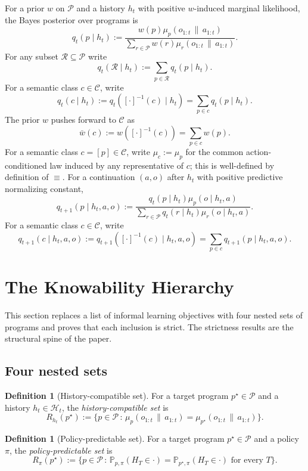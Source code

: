 \documentclass[11pt]{article}
\theoremstyle{definition}
\newtheorem{definition}[theorem]{Definition}
\theoremstyle{remark}
\newcommand{\Ccal}{\mathcal{C}}
\newcommand{\Pcal}{\mathcal{P}}
\newcommand{\Hcal}{\mathcal{H}}
\newcommand{\Rcal}{\mathcal{R}}
\newcommand{\Prob}{\mathbb{P}}
\newcommand{\givena}{\,\|\,}
\begin{document}
For a prior $w$ on $\Pcal$ and a history $h_t$ with positive $w$-induced marginal likelihood, the Bayes posterior over programs is
\[
q_t(p\mid h_t)
:=
\frac{w(p)\mu_p(o_{1:t}\givena a_{1:t})}
{\sum_{r\in\Pcal} w(r)\mu_r(o_{1:t}\givena a_{1:t})}.
\]
For any subset $\Rcal\subseteq\Pcal$ write
\[
q_t(\Rcal\mid h_t):=\sum_{p\in\Rcal} q_t(p\mid h_t).
\]
For a semantic class $c\in\Ccal$, write
\[
q_t(c\mid h_t):=q_t([\cdot]^{-1}(c)\mid h_t)=\sum_{p\in c} q_t(p\mid h_t).
\]
The prior $w$ pushes forward to $\Ccal$ as
\[
\bar w(c):=w([\cdot]^{-1}(c))=\sum_{p\in c}w(p).
\]
For a semantic class $c=[p]\in\Ccal$, write $\mu_c:=\mu_p$ for the common action-conditioned law induced by any representative of $c$; this is well-defined by definition of $\equiv$.
For a continuation $(a,o)$ after $h_t$ with positive predictive normalizing constant,
\[
q_{t+1}(p\mid h_t,a,o)
:=
\frac{q_t(p\mid h_t)\mu_p(o\mid h_t,a)}
{\sum_{r\in\Pcal} q_t(r\mid h_t)\mu_r(o\mid h_t,a)}.
\]
For a semantic class $c\in\Ccal$, write
\[
q_{t+1}(c\mid h_t,a,o):=q_{t+1}([\cdot]^{-1}(c)\mid h_t,a,o)=\sum_{p\in c} q_{t+1}(p\mid h_t,a,o).
\]

\section{The Knowability Hierarchy}
\label{sec:hierarchy}

This section replaces a list of informal learning objectives with four nested sets of programs and proves that each inclusion is strict. The strictness results are the structural spine of the paper.

\subsection{Four nested sets}

\begin{definition}[History-compatible set]
\label{def:history-compat}
For a target program $p^\star\in\Pcal$ and a history $h_t\in\Hcal_t$, the \emph{history-compatible set} is
\[
R_{h_t}(p^\star)
:=
\bigl\{p\in\Pcal\,:\,\mu_p(o_{1:t}\givena a_{1:t})=\mu_{p^\star}(o_{1:t}\givena a_{1:t})\bigr\}.
\]
\end{definition}

\begin{definition}[Policy-predictable set]
\label{def:policy-pred}
For a target program $p^\star\in\Pcal$ and a policy $\pi$, the \emph{policy-predictable set} is
\[
R_\pi(p^\star)
:=
\bigl\{p\in\Pcal\,:\,\Prob_{p,\pi}(H_T\in\cdot)=\Prob_{p^\star,\pi}(H_T\in\cdot)\text{ for every }T\bigr\}.
\]
\end{definition}
\end{document}
